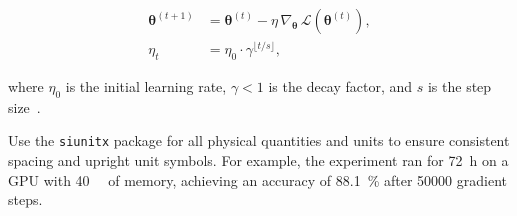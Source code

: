 \begin{align}
  \boldsymbol{\theta}^{(t+1)}
    &= \boldsymbol{\theta}^{(t)}
       - \eta\,\nabla_{\!\boldsymbol{\theta}}\,
         \mathcal{L}\!\left(\boldsymbol{\theta}^{(t)}\right),
       \label{eq:ch2-sgd} \\
  \eta_{t}
    &= \eta_{0}\cdot\gamma^{\lfloor t/s \rfloor},
       \label{eq:ch2-lr}
\end{align}

where $\eta_{0}$ is the initial learning rate, $\gamma < 1$ is the
decay factor, and $s$ is the step size~\cite{lecun1998}.

Use the \texttt{siunitx} package for all physical quantities and
units to ensure consistent spacing and upright unit symbols.
For example, the experiment ran for \SI{72}{\hour} on a GPU with
\SI{40}{\giga\byte} of memory, achieving an accuracy of
\SI{88.1}{\percent} after \num{50000} gradient steps.

\lipsum[9]

\printbibliography[heading=subbibliography, title={References}]
